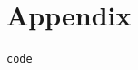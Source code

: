 \documentclass[a4paper]{article}
\begin{document}
\newpage 
    \section{Appendix} 


\begin{lstlisting}
code
\end{lstlisting}
\end{document}
